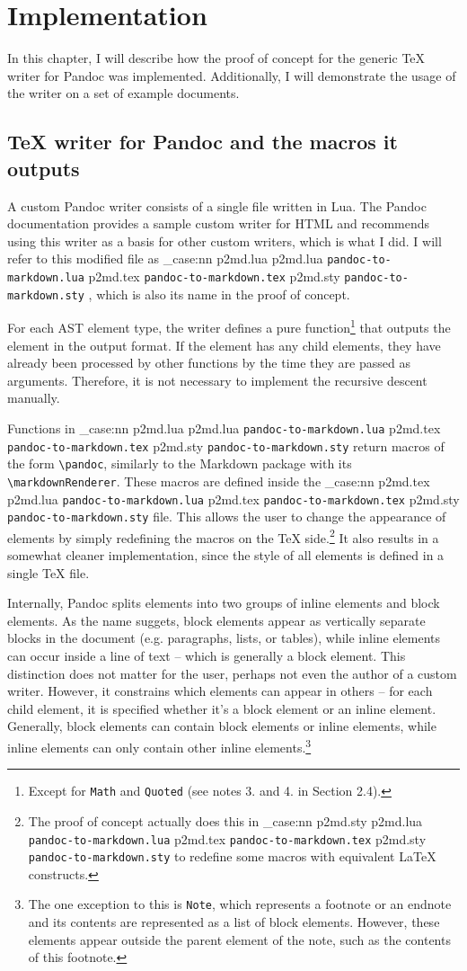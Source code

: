 \documentclass[
  digital,     %
  oneside,     %
  nosansbold,  %
  nocolorbold, %
  lof,         %
  nolot,       %
]{fithesis4}
\newcommand\macro[1]{\texttt{\textbackslash{}{#1}}}
\newcommand\pandoc[1]{\macro{pandoc\-{#1}}}
\newcommand\renderer[1]{\macro{markdown\-Renderer\-{#1}}}
\newcommand\file[1]
  {
    \str_case:nn
      { #1 }
      {
        { p2md.lua } { \texttt{pandoc\hyp{}to\hyp{}markdown.lua} }
        { p2md.tex } { \texttt{pandoc\hyp{}to\hyp{}markdown.tex} }
        { p2md.sty } { \texttt{pandoc\hyp{}to\hyp{}markdown.sty} }
      }
  }
\begin{document}
\chapter{Implementation}
In this chapter, I will describe how the proof of concept for the generic \TeX{} writer for Pandoc was implemented. Additionally, I will demonstrate the usage of the writer on a set of example documents.

\section{\TeX{} writer for Pandoc and the macros it outputs}
A custom Pandoc writer consists of a single file written in Lua. The Pandoc documentation provides a sample custom writer for HTML and recommends using this writer as a basis for other custom writers, which is what I did. I will refer to this modified file as \file{p2md.lua}, which is also its name in the proof of concept.

For each AST element type, the writer defines a pure function\footnote{Except for \texttt{Math} and \texttt{Quoted} (see notes 3. and 4. in Section 2.4).} that outputs the element in the output format. If the element has any child elements, they have already been processed by other functions by the time they are passed as arguments. Therefore, it is not necessary to implement the recursive descent manually.

Functions in \file{p2md.lua} return macros of the form \pandoc{ElementName}, similarly to the Markdown package with its \renderer{ElementName}. These macros are defined inside the \file{p2md.tex} file. This allows the user to change the appearance of elements by simply redefining the macros on the \TeX{} side.\footnote{The proof of concept actually does this in \file{p2md.sty} to redefine some macros with equivalent \LaTeX{} constructs.} It also results in a somewhat cleaner implementation, since the style of all elements is defined in a single \TeX{} file. 

Internally, Pandoc splits elements into two groups of inline elements and block elements. As the name suggets, block elements appear as vertically separate blocks in the document (e.g. paragraphs, lists, or tables), while inline elements can occur inside a line of text -- which is generally a block element. This distinction does not matter for the user, perhaps not even the author of a custom writer. However, it constrains which elements can appear in others -- for each child element, it is specified whether it's a block element or an inline element. Generally, block elements can contain block elements or inline elements, while inline elements can only contain other inline elements.\footnote{The one exception to this is \texttt{Note}, which represents a footnote or an endnote and its contents are represented as a list of block elements. However, these elements appear outside the parent element of the note, such as the contents of this footnote.}
\end{document}
